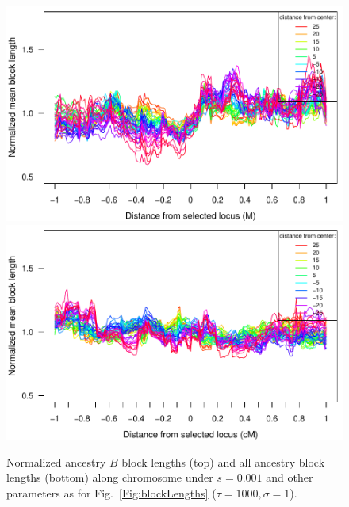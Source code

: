\begin{figure}
    \includegraphics{figs/s001_adjacentBlocksAlongChromAncBConditioning}
    \includegraphics{figs/s001_adjacentBlocksAlongChromNoConditioningHighRes}
        \caption{
     Normalized ancestry $B$ block lengths (top) and all ancestry block lengths (bottom) along chromosome under $s=0.001$ and other parameters as for Fig.~\ref{Fig:blockLengths} ($\tau=1000,\sigma=1$). } \label{sfig:blockLengthPlot_t1000_s0.001}
\end{figure}


% 
